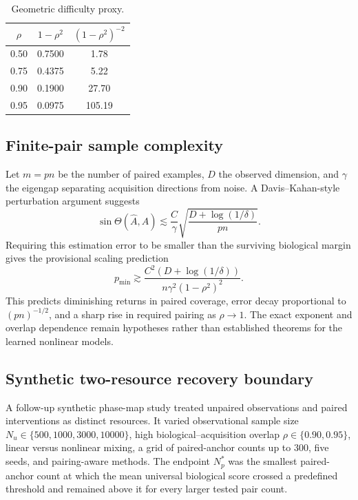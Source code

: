 \begin{table}[t]
\centering
\caption{Geometric difficulty proxy.}
\small
\begin{tabular}{ccc}
\toprule
$\rho$ & $1-\rho^2$ & $(1-\rho^2)^{-2}$\\
\midrule
0.50 & 0.7500 & 1.78\\
0.75 & 0.4375 & 5.22\\
0.90 & 0.1900 & 27.70\\
0.95 & 0.0975 & 105.19\\
\bottomrule
\end{tabular}
\end{table}

\subsection{Finite-pair sample complexity}
Let $m=pn$ be the number of paired examples, $D$ the observed dimension, and $\gamma$ the eigengap separating acquisition directions from noise. A Davis--Kahan-style perturbation argument suggests
\begin{equation}
  \sin\Theta(\widehat A,A)
  \lesssim
  \frac{C}{\gamma}
  \sqrt{\frac{D+\log(1/\delta)}{pn}}.
\end{equation}
Requiring this estimation error to be smaller than the surviving biological margin gives the provisional scaling prediction
\begin{equation}
  p_{\min}
  \gtrsim
  \frac{C^2(D+\log(1/\delta))}
  {n\gamma^2(1-\rho^2)^2}.
\end{equation}
This predicts diminishing returns in paired coverage, error decay proportional to $(pn)^{-1/2}$, and a sharp rise in required pairing as $\rho\rightarrow1$. The exact exponent and overlap dependence remain hypotheses rather than established theorems for the learned nonlinear models.

\subsection{Synthetic two-resource recovery boundary}
A follow-up synthetic phase-map study treated unpaired observations and paired interventions as distinct resources. It varied observational sample size $N_u\in\{500,1000,3000,10000\}$, high biological--acquisition overlap $\rho\in\{0.90,0.95\}$, linear versus nonlinear mixing, a grid of paired-anchor counts up to 300, five seeds, and pairing-aware methods. The endpoint $N_p^{\ast}$ was the smallest paired-anchor count at which the mean universal biological score crossed a predefined threshold and remained above it for every larger tested pair count.

